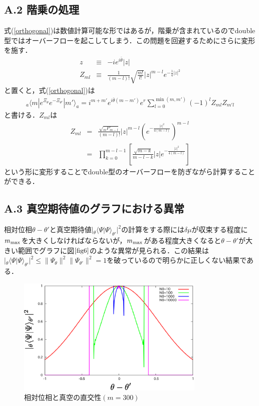\documentclass[10.5pt,a4paper]{jreport}
\begin{document}
\subsection*{A.2  階乗の処理}
式(\ref{orthogonal})は数値計算可能な形ではあるが，階乗が含まれているのでdouble型ではオーバーフローを起こしてしまう．この問題を回避するためにさらに変形を施す．
\begin{eqnarray}
  z&\equiv&-ie^{i\bar \theta}|z|\\
  Z_{ml} &\equiv& \frac{1}{(m-l)!}\sqrt{\frac{m!}{l!}}|z|^{m-l}e^{-\frac{1}{4}|z|^2}
\end{eqnarray}
と置くと，式(\ref{orthogonal})は
\begin{eqnarray}
  _a\langle m|e^{\Xi_\theta}e^{-\Xi_{\theta'}}|m'\rangle_a
  =i^{m+m'}e^{i\bar \theta(m-m')}e^{r}\sum_{l=0}^{\min(m,m')}(-1)^l Z_{ml}Z_{m'l}
\end{eqnarray}
と書ける．$Z_{ml}$は
\begin{eqnarray}
  \nonumber
  Z_{ml} &=& \frac{\sqrt{_mP_{m-l}}}{(m-l)!}|z|^{m-l}\left(e^{-\frac{|z|^2}{4(m-l)}}\right)^{m-l}\\
  &=&\prod_{k=0}^{m-l-1}\left[\frac{\sqrt{m-k}}{m-l-k}|z|e^{-\frac{|z|^2}{4(m-l)}}\right]\label{Zml}
\end{eqnarray}
という形に変形することでdouble型のオーバーフローを防ぎながら計算することができる．
\subsection*{A.3  真空期待値のグラフにおける異常}
相対位相$\theta - \theta'$と真空期待値$|_\theta\langle\Psi|\Psi\rangle_{\theta'}|^2$の計算をする際には$\delta \mu$が収束する程度に$m_{\rm max}$を大きくしなければならないが，$m_{\rm max}$がある程度大きくなると$\theta - \theta'$が大きい範囲でグラフに図$\ref{fig6}$のような異常が見られる．この結果は$|_\theta\langle\Psi|\Psi\rangle_{\theta'}|^2 \leq \parallel\Psi_\theta\parallel^2\parallel\Psi_{\theta'}\parallel^2=1$を破っているので明らかに正しくない結果である．
\begin{figure}[htbp]
  \centering
  \includegraphics[width = 9cm]{./EPS/fig6.eps}
  \caption{相対位相と真空の直交性$(m=300)$}
  \label{fig6}
\end{figure}
\end{document}
